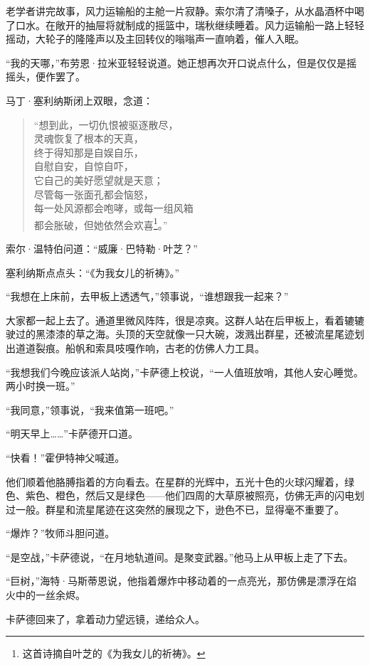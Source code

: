 \documentclass[AutoFakeBold=true]{book}
\begin{document}
老学者讲完故事，风力运输船的主舱一片寂静。索尔清了清嗓子，从水晶酒杯中喝了口水。在敞开的抽屉将就制成的摇篮中，瑞秋继续睡着。风力运输船一路上轻轻摇动，大轮子的隆隆声以及主回转仪的嗡嗡声一直响着，催人入眠。

``我的天哪，''布劳恩·拉米亚轻轻说道。她正想再次开口说点什么，但是仅仅是摇摇头，便作罢了。

马丁·塞利纳斯闭上双眼，念道：

\begin{quote}
	{\kaishu ``想到此，一切仇恨被驱逐散尽，\\
	灵魂恢复了根本的天真，\\
	终于得知那是自娱自乐，\\
	自慰自安，自惊自吓，\\
	它自己的美好愿望就是天意；\\
	尽管每一张面孔都会恼怒，\\
	每一处风源都会咆哮，或每一组风箱\\
	都会胀破，但她依然会欢喜}\footnote{这首诗摘自叶芝的《为我女儿的祈祷》。}。''
\end{quote}

索尔·温特伯问道：``威廉·巴特勒·叶芝？''

塞利纳斯点点头：``《为我女儿的祈祷》。''

``我想在上床前，去甲板上透透气，''领事说，``谁想跟我一起来？''

大家都一起上去了。通道里微风阵阵，很是凉爽。这群人站在后甲板上，看着辘辘驶过的黑漆漆的草之海。头顶的天空就像一只大碗，泼溅出群星，还被流星尾迹划出道道裂痕。船帆和索具吱嘎作响，古老的仿佛人力工具。

``我想我们今晚应该派人站岗，''卡萨德上校说，``一人值班放哨，其他人安心睡觉。两小时换一班。''

``我同意，''领事说，``我来值第一班吧。''

``明天早上……''卡萨德开口道。

``快看！''霍伊特神父喊道。

他们顺着他胳膊指着的方向看去。在星群的光辉中，五光十色的火球闪耀着，绿色、紫色、橙色，然后又是绿色——他们四周的大草原被照亮，仿佛无声的闪电划过一般。群星和流星尾迹在这突然的展现之下，逊色不已，显得毫不重要了。

``爆炸？''牧师斗胆问道。

``是空战，''卡萨德说，``在月地轨道间。是聚变武器。''他马上从甲板上走了下去。

``巨树，''海特·马斯蒂恩说，他指着爆炸中移动着的一点亮光，那仿佛是漂浮在焰火中的一丝余烬。

卡萨德回来了，拿着动力望远镜，递给众人。
\end{document}
